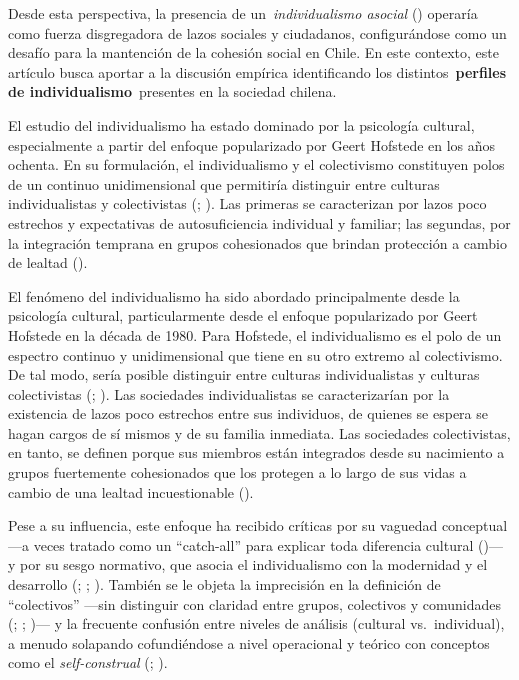 \documentclass[
  letterpaper,
  DIV=11,
  numbers=noendperiod]{scrartcl}
\begin{document}
Desde esta perspectiva, la presencia de un~\emph{individualismo asocial}
() operaría como fuerza
disgregadora de lazos sociales y ciudadanos, configurándose como un
desafío para la mantención de la cohesión social en Chile. En este
contexto, este artículo busca aportar a la discusión empírica
identificando los distintos~\textbf{perfiles de
individualismo}~presentes en la sociedad chilena.

El estudio del individualismo ha estado dominado por la psicología
cultural, especialmente a partir del enfoque popularizado por Geert
Hofstede en los años ochenta. En su formulación, el individualismo y el
colectivismo constituyen polos de un continuo unidimensional que
permitiría distinguir entre culturas individualistas y colectivistas
(;
). Las primeras se caracterizan por
lazos poco estrechos y expectativas de autosuficiencia individual y
familiar; las segundas, por la integración temprana en grupos
cohesionados que brindan protección a cambio de lealtad
().

El fenómeno del individualismo ha sido abordado principalmente desde la
psicología cultural, particularmente desde el enfoque popularizado por
Geert Hofstede en la década de 1980. Para Hofstede, el individualismo es
el polo de un espectro continuo y unidimensional que tiene en su otro
extremo al colectivismo. De tal modo, sería posible distinguir entre
culturas individualistas y culturas colectivistas
(;
). Las sociedades individualistas se
caracterizarían por la existencia de lazos poco estrechos entre sus
individuos, de quienes se espera se hagan cargos de sí mismos y de su
familia inmediata. Las sociedades colectivistas, en tanto, se definen
porque sus miembros están integrados desde su nacimiento a grupos
fuertemente cohesionados que los protegen a lo largo de sus vidas a
cambio de una lealtad incuestionable ().

Pese a su influencia, este enfoque ha recibido críticas por su vaguedad
conceptual ---a veces tratado como un ``catch-all'' para explicar toda
diferencia cultural ()--- y por su sesgo normativo, que asocia el individualismo con la
modernidad y el desarrollo (; ;
). También se le objeta la
imprecisión en la definición de ``colectivos'' ---sin distinguir con
claridad entre grupos, colectivos y comunidades
(;
;
)--- y la
frecuente confusión entre niveles de análisis (cultural vs.~individual),
a menudo solapando cofundiéndose a nivel operacional y teórico con
conceptos como el \emph{self-construal} (; ).
\end{document}
